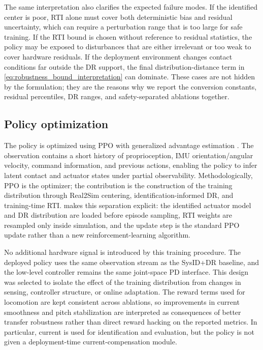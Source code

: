 \documentclass[twoside,final,1p,times]{elsarticle}
\newcommand{\rev}[1]{#1}
\newcommand{\minorrev}[1]{#1}
\newenvironment{revblock}{}{}
\begin{document}
\begin{revblock}
The same interpretation also clarifies the expected failure modes. If the identified center is poor, RTI alone must cover both deterministic bias and residual uncertainty, which can require a perturbation range that is too large for safe training. If the RTI bound is chosen without reference to residual statistics, the policy may be exposed to disturbances that are either irrelevant or too weak to cover hardware residuals. If the deployment environment changes contact conditions far outside the DR support, the final distribution-distance term in \cref{eq:robustness_bound_interpretation} can dominate. These cases are not hidden by the formulation; they are the reasons why we report the conversion constants, residual percentiles, DR ranges, and safety-separated ablations together.
\end{revblock}

\subsection{Policy optimization}
The policy is optimized using PPO \minorrev{\citep{rudin2022minutes}} with generalized advantage estimation \minorrev{\citep{schulman2016gae}}. The observation contains a short history of proprioception, IMU orientation/angular velocity, command information, and previous actions, enabling the policy to infer latent contact and actuator states under partial observability. Methodologically, PPO is the optimizer; the contribution is the construction of the training distribution through Real2Sim centering, identification-informed DR, and training-time RTI. \rev{ makes this separation explicit: the identified actuator model and DR distribution are loaded before episode sampling, RTI weights are resampled only inside simulation, and the update step is the standard PPO update rather than a new reinforcement-learning algorithm.}

\begin{revblock}
No additional hardware signal is introduced by this training procedure. The deployed policy uses the same observation stream as the SysID+DR baseline, and the low-level controller remains the same joint-space PD interface. This design was selected to isolate the effect of the training distribution from changes in sensing, controller structure, or online adaptation. The reward terms used for locomotion are kept consistent across ablations, so improvements in current smoothness and pitch stabilization are interpreted as consequences of better transfer robustness rather than direct reward hacking on the reported metrics. In particular, current is used for identification and evaluation, but the policy is not given a deployment-time current-compensation module.
\end{revblock}
\end{document}
